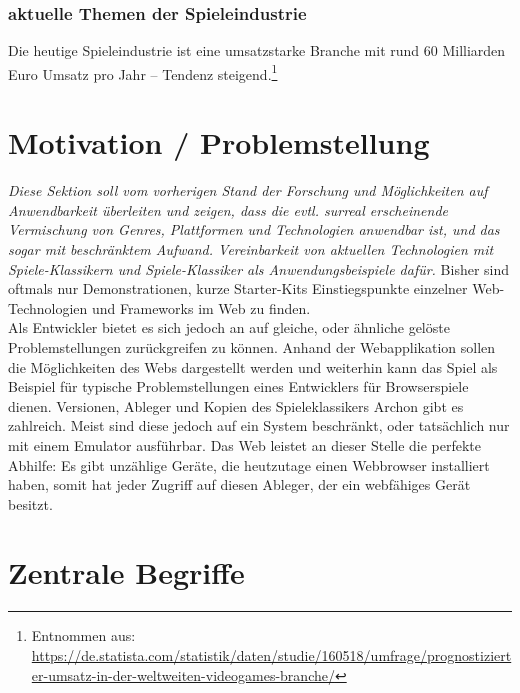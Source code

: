 \subsubsection{aktuelle Themen der Spieleindustrie}
Die heutige Spieleindustrie ist eine umsatzstarke Branche mit rund 60 Milliarden Euro Umsatz pro Jahr -- Tendenz steigend.\footnote{Entnommen aus:\\ \url{https://de.statista.com/statistik/daten/studie/160518/umfrage/prognostizierter-umsatz-in-der-weltweiten-videogames-branche/}}

\section{Motivation / Problemstellung}
\label{sec:motivation}
\emph{ Diese Sektion soll vom vorherigen Stand der Forschung und Möglichkeiten auf Anwendbarkeit überleiten und zeigen, dass die evtl. surreal erscheinende Vermischung von Genres, Plattformen und Technologien anwendbar ist, und das sogar mit beschränktem Aufwand. Vereinbarkeit von aktuellen Technologien mit Spiele-Klassikern und Spiele-Klassiker als Anwendungsbeispiele dafür.}
Bisher sind oftmals nur Demonstrationen, kurze Starter-Kits \bzw Einstiegspunkte einzelner Web-Technologien und Frameworks im Web zu finden.\\
Als Entwickler bietet es sich jedoch an auf gleiche, oder ähnliche gelöste Problemstellungen zurückgreifen zu können.
Anhand der Webapplikation sollen die Möglichkeiten des Webs dargestellt werden und weiterhin kann das Spiel als Beispiel für typische Problemstellungen eines Entwicklers für Browserspiele dienen.
Versionen, Ableger und Kopien des Spieleklassikers Archon gibt es zahlreich. Meist sind diese jedoch auf ein System beschränkt, oder tatsächlich nur mit einem Emulator ausführbar. Das Web leistet an dieser Stelle die perfekte Abhilfe: Es gibt unzählige Geräte, die heutzutage einen Webbrowser installiert haben, somit hat jeder Zugriff auf diesen Ableger, der ein webfähiges Gerät besitzt.

\section{Zentrale Begriffe}
\label{sec:zentrale_begriffe}


